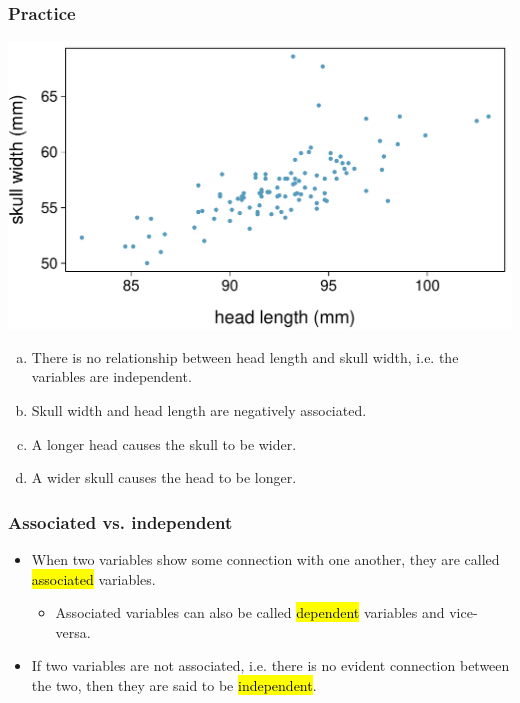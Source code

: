 \begin{frame}
\frametitle{Practice}

{
}
{
\includegraphics[width=\textwidth]{figures/possum_head_skull/possum_head_skull}
}

\begin{enumerate}[(a)]
\item There is no relationship between head length and skull width, i.e. the variables are independent.
\item Skull width and head length are negatively associated.
\item A longer head causes the skull to be wider.
\item A wider skull causes the head to be longer.
\end{enumerate}

\end{frame}


\begin{frame}
\frametitle{Associated vs. independent}

\begin{itemize}

\item When two variables show some connection with one another, they are called \hl{associated} variables.
\begin{itemize}
\item Associated variables can also be called \hl{dependent} variables and vice-versa.
\end{itemize}

\item If two variables are not associated, i.e. there is no evident connection between the two, then they are said to be \hl{independent}.

\end{itemize}

\end{frame}

